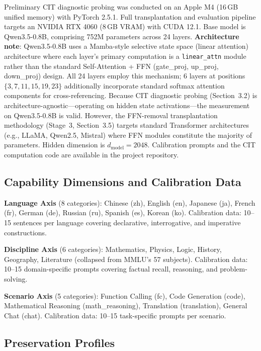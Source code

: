 \documentclass[twocolumn]{article}
\begin{document}
Preliminary CIT diagnostic probing was conducted on an Apple M4 (16\,GB unified memory) with PyTorch 2.5.1.
Full transplantation and evaluation pipeline targets an NVIDIA RTX 4060 (8\,GB VRAM) with CUDA 12.1.
Base model is Qwen3.5-0.8B, comprising 752M parameters across 24 layers.
\textbf{Architecture note}: Qwen3.5-0.8B uses a Mamba-style selective state space (linear attention) architecture where each layer's primary computation is a \texttt{linear\_attn} module rather than the standard Self-Attention + FFN (gate\_proj, up\_proj, down\_proj) design.
All 24 layers employ this mechanism; 6 layers at positions $\{3, 7, 11, 15, 19, 23\}$ additionally incorporate standard softmax attention components for cross-referencing.
Because CIT diagnostic probing (Section~3.2) is architecture-agnostic---operating on hidden state activations---the measurement on Qwen3.5-0.8B is valid. However, the FFN-removal transplantation methodology (Stage~3, Section~3.5) targets standard Transformer architectures (e.g., LLaMA, Qwen2.5, Mistral) where FFN modules constitute the majority of parameters.
Hidden dimension is $d_{\text{model}} = 2048$. Calibration prompts and the CIT computation code are available in the project repository.

\subsection{Capability Dimensions and Calibration Data}

\textbf{Language Axis} (8 categories): Chinese (zh), English (en), Japanese (ja), French (fr), German (de), Russian (ru), Spanish (es), Korean (ko).
Calibration data: 10--15 sentences per language covering declarative, interrogative, and imperative constructions.

\textbf{Discipline Axis} (6 categories): Mathematics, Physics, Logic, History, Geography, Literature (collapsed from MMLU's 57 subjects).
Calibration data: 10--15 domain-specific prompts covering factual recall, reasoning, and problem-solving.

\textbf{Scenario Axis} (5 categories): Function Calling (fc), Code Generation (code), Mathematical Reasoning (math\_reasoning), Translation (translation), General Chat (chat).
Calibration data: 10--15 task-specific prompts per scenario.

\subsection{Preservation Profiles}
\end{document}
